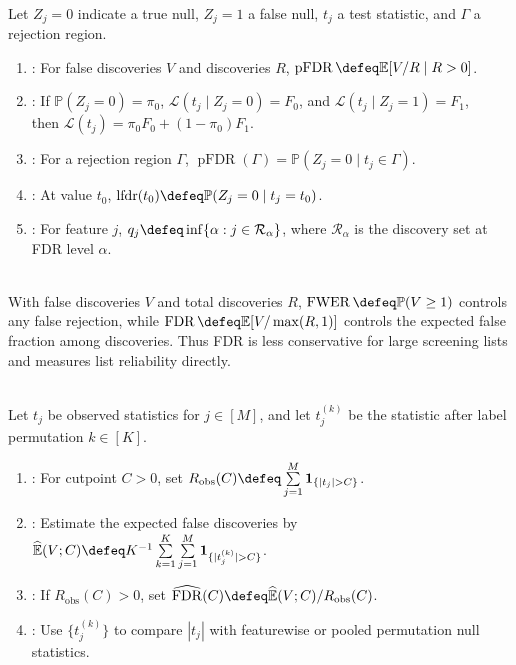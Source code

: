 \begin{definition} \label{def:pfd-local-fdr-and-q-value} \\
Let $Z_j=0$ indicate a true null, $Z_j=1$ a false null, $t_j$ a test statistic, and $\Gamma$ a rejection region.
\begin{enumerate}[label=(\roman*)]
\setlength{\itemsep}{0pt}
\item {}: For false discoveries $V$ and discoveries $R$, $\operatorname{pFDR}\defeq\mathbb{E}[V/R\mid R>0]$.
\item {}: If $\mathbb{P}(Z_j=0)=\pi_0$, $\mathcal{L}(t_j\mid Z_j=0)=F_0$, and $\mathcal{L}(t_j\mid Z_j=1)=F_1$,\\
then $\mathcal{L}(t_j)=\pi_0F_0+(1-\pi_0)F_1$.
\item {}: For a rejection region $\Gamma$, $\operatorname{pFDR}(\Gamma)=\mathbb{P}(Z_j=0\mid t_j\in\Gamma)$.
\item {}: At value $t_0$, $\operatorname{lfdr}(t_0)\defeq\mathbb{P}(Z_j=0\mid t_j=t_0)$.
\item {}: For feature $j$, $q_j\defeq\inf\{\alpha:j\in\mathcal{R}_\alpha\}$, where $\mathcal{R}_\alpha$ is the discovery set at FDR level $\alpha$.
\end{enumerate}
\end{definition}

\begin{remark} \label{rem:fdr-versus-family-wise-error} \\
With false discoveries $V$ and total discoveries $R$, $\operatorname{FWER}\defeq\mathbb{P}(V\geq1)$ controls any false rejection, while $\operatorname{FDR}\defeq\mathbb{E}[V/\max(R,1)]$ controls the expected false fraction among discoveries.
Thus FDR is less conservative for large screening lists and measures list reliability directly.
\end{remark}

\begin{method} \label{meth:permutation-plug-in-fdr} \\
Let $t_j$ be observed statistics for $j\in[M]$, and let $t_j^{(k)}$ be the statistic after label permutation $k\in[K]$.
\begin{enumerate}[label=(\roman*)]
\setlength{\itemsep}{0pt}
\item {}: For cutpoint $C>0$, set $R_{\mathrm{obs}}(C)\defeq\sum\limits_{j=1}^M\mathbf{1}_{\{|t_j|>C\}}$.
\item {}: Estimate the expected false discoveries by $\widehat{\mathbb{E}}(V;C)\defeq K^{-1}\sum\limits_{k=1}^K\sum\limits_{j=1}^M\mathbf{1}_{\{|t_j^{(k)}|>C\}}$.
\item {}: If $R_{\mathrm{obs}}(C)>0$, set $\widehat{\operatorname{FDR}}(C)\defeq\widehat{\mathbb{E}}(V;C)/R_{\mathrm{obs}}(C)$.
\item {}: Use $\{t_j^{(k)}\}$ to compare $|t_j|$ with featurewise or pooled permutation null statistics.
\end{enumerate}
\end{method}

